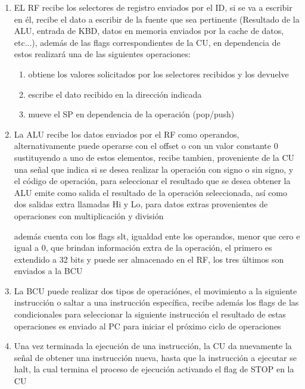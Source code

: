 \documentclass{article}
\begin{document}
\begin{enumerate}
            \item EL RF recibe los selectores de registro enviados por el ID, si se va a escribir en \'el, recibe el dato a escribir de la fuente que sea pertinente (Resultado de la ALU, entrada de KBD, datos en memoria enviados por la cache de datos, etc...), adem\'as de las flags correspondientes de la CU, en dependencia de estos realizar\'a una de las siguientes operaciones:
            \begin{enumerate}
                \item obtiene los valores solicitados por los selectores recibidos y los devuelve
                \item escribe el dato recibido en la direcci\'on indicada 
                \item mueve el SP en dependencia de la operaci\'on (pop/push)
            \end{enumerate}

            \item La ALU recibe los datos enviados por el RF como operandos, alternativamente puede operarse con el offset o con un valor constante 0 sustituyendo a uno de estos elementos,
            recibe tambien, proveniente de la CU una se\~nal que indica si se desea realizar la operaci\'on con signo o sin signo, y el c\'odigo de operaci\'on, para seleccionar el resultado que se desea obtener
            la ALU emite como salida el resultado de la operaci\'on seleccionada, as\'i como dos salidas extra llamadas Hi y Lo, para datos extras provenientes de operaciones con multiplicaci\'on y divisi\'on
            
            adem\'as cuenta con los flags slt, igualdad ente los operandos, menor que cero e igual a 0, que brindan informaci\'on extra de la operaci\'on, el primero es extendido a 32 bits y puede ser almacenado en el RF, los tres \'ultimos son enviados a la BCU
            
            \item La BCU puede realizar dos tipos de operaci\'ones, el movimiento a la siguiente instrucci\'on o saltar a una instrucci\'on espec\'ifica, recibe adem\'as los flags de las condicionales para seleccionar la siguiente instrucci\'on
            el resultado de estas operaciones es enviado al PC para iniciar el pr\'oximo ciclo de operaciones

            \item Una vez terminada la ejecuci\'on de una instrucci\'on, la CU da nuevamente la se\~nal de obtener una instrucci\'on nueva, hasta que la instrucci\'on a ejecutar se halt, la cual termina el proceso de ejecuci\'on activando el flag de STOP en la CU
            

        \end{enumerate}
            
\end{document}
